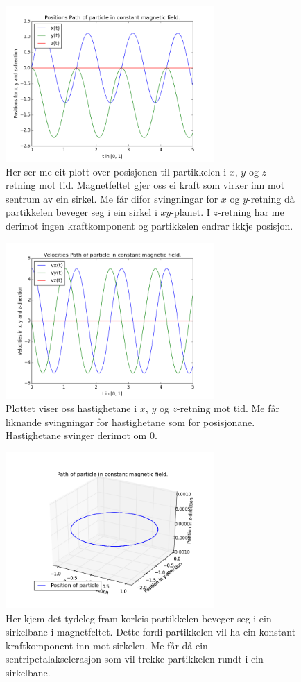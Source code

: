 \documentclass[11pt, a4paper]{article}
\begin{document}
  \begin{figure}[H]
    \centering
    \includegraphics[width=300px]{2A1.png}
    \caption{Her ser me eit plott over posisjonen til partikkelen i $x$, $y$ og $z$-retning mot tid. Magnetfeltet gjer oss ei kraft som virker inn mot sentrum av ein sirkel. 
    Me får difor svingningar for $x$ og $y$-retning då partikkelen beveger seg i ein sirkel i $xy$-planet. I $z$-retning har me derimot ingen kraftkomponent og partikkelen endrar ikkje 
    posisjon.}
  \end{figure}

  \begin{figure}[H]
    \centering
    \includegraphics[width=300px]{2A2.png}
    \caption{Plottet viser oss hastighetane i $x$, $y$ og $z$-retning mot tid. Me får liknande svingningar for hastighetane som for posisjonane. Hastighetane svinger derimot om 0.}
  \end{figure}

  \begin{figure}[H]
    \centering
    \includegraphics[width=300px]{2A3.png}
    \caption{Her kjem det tydeleg fram korleis partikkelen beveger seg i ein sirkelbane i magnetfeltet. Dette fordi partikkelen vil ha ein konstant kraftkomponent inn mot sirkelen.
    Me får då ein sentripetalakselerasjon som vil trekke partikkelen rundt i ein sirkelbane.}
  \end{figure}
\end{document}
